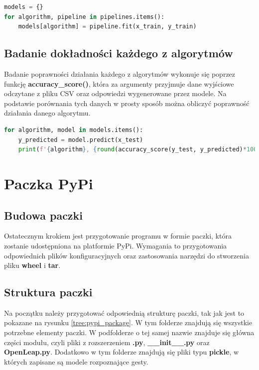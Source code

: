 \begin{lstlisting}[language=python, style=programming, captionpos=b, caption={Trenowanie modeli}]
models = {}
for algorithm, pipeline in pipelines.items():
    models[algorithm] = pipeline.fit(x_train, y_train)
\end{lstlisting}


\subsection{Badanie dokładności każdego z algorytmów}

\quad Badanie poprawności działania każdego z algorytmów wykonuje się poprzez funkcję \textbf{accuracy\_score()}, która za argumenty przyjmuje dane wyjściowe odczytane z pliku CSV oraz odpowiedzi wygenerowane przez modele. Na podstawie porównania tych danych w prosty sposób można obliczyć poprawność działania danego algorytmu.  \newline

\begin{lstlisting}[language=python, style=programming, captionpos=b, caption={Sprawdzenie poprawności}]
for algorithm, model in models.items():
    y_predicted = model.predict(x_test)
    print(f'{algorithm}, {round(accuracy_score(y_test, y_predicted)*100,2)}%')
\end{lstlisting}


\section{Paczka PyPi}

\subsection{Budowa paczki}

\quad Ostatecznym krokiem jest przygotowanie programu w formie paczki, która zostanie udostępniona na platformie PyPi. Wymagania to przygotowania odpowiednich plików konfiguracyjnych oraz zastosowania narzędzi do stworzenia pliku \textbf{wheel} i \textbf{tar}. 

\subsection{Struktura paczki}
\quad Na początku należy przygotować odpowiednią strukturę paczki, tak jak jest to pokazane na rysunku \ref{tree:pypi_package}. W tym folderze znajdują się wszystkie potrzebne elementy paczki. W podfolderze o tej samej nazwie znajduje się główna części modułu, czyli pliki z rozszerzeniem \textbf{.py}, \textbf{\_\_init\_\_.py} oraz \textbf{OpenLeap.py}. Dodatkowo w tym folderze znajdują się pliki typu \textbf{pickle}, w których zapisane są modele rozpoznające gesty.


